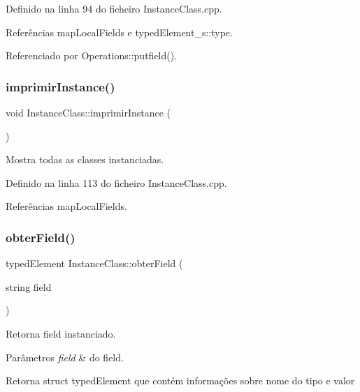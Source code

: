 Definido na linha 94 do ficheiro Instance\+Class.\+cpp.



Referências map\+Local\+Fields e typed\+Element\+\_\+s\+::type.



Referenciado por Operations\+::putfield().

\mbox{\label{classInstanceClass_a9790b6bb982d58a0bbddcb8c9ba358d4}} 
\subsubsection{\texorpdfstring{imprimir\+Instance()}{imprimirInstance()}}
{\footnotesize\ttfamily void Instance\+Class\+::imprimir\+Instance (\begin{DoxyParamCaption}{ }\end{DoxyParamCaption})}



Mostra todas as classes instanciadas. 



Definido na linha 113 do ficheiro Instance\+Class.\+cpp.



Referências map\+Local\+Fields.

\mbox{\label{classInstanceClass_a98084eb37c43d680169298bc50f09c98}} 
\subsubsection{\texorpdfstring{obter\+Field()}{obterField()}}
{\footnotesize\ttfamily typed\+Element Instance\+Class\+::obter\+Field (\begin{DoxyParamCaption}\item[{string}]{field }\end{DoxyParamCaption})}



Retorna field instanciado. 


\begin{DoxyParams}{Parâmetros}
{\em field} & do field. \\
\hline
\end{DoxyParams}
\begin{DoxyReturn}{Retorna}
struct typed\+Element que contém informações sobre nome do tipo e valor 
\end{DoxyReturn}


